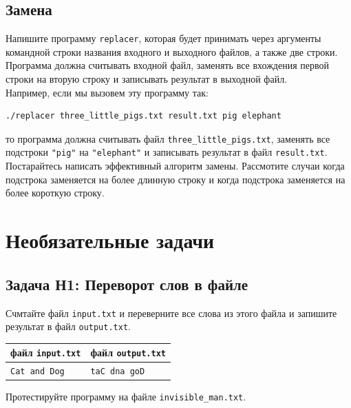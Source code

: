 \documentclass{article}
\begin{document}
\subsection{Замена}
Напишите программу \texttt{replacer}, которая будет принимать через аргументы командной строки названия входного и выходного файлов, а также две строки. Программа должна считывать входной файл, заменять все вхождения первой строки на вторую строку и записывать результат в выходной файл.\\
Например, если мы вызовем эту программу так:
\begin{verbatim}
./replacer three_little_pigs.txt result.txt pig elephant
\end{verbatim}
то программа должна считывать файл \texttt{three\_little\_pigs.txt}, заменять все подстроки \texttt{"pig"} на \texttt{"elephant"} и записывать результат в файл \texttt{result.txt}. Постарайтесь написать эффективный алгоритм замены. Рассмотите случаи когда подстрока заменяется на более длинную строку и когда подстрока заменяется на более короткую строку.


\newpage
\section*{Необязательные задачи}
\subsection*{Задача Н1: Переворот слов в файле}
Счмтайте файл \texttt{input.txt}  и переверните все слова из этого файла и запишите результат в файл \texttt{output.txt}.
\begin{center} 
\begin{tabular}{ l | l }
 файл \texttt{input.txt} & файл \texttt{output.txt} \\ \hline
 \texttt{Cat and Dog} & \texttt{taC dna goD}\\
\end{tabular}
\end{center}
Протестируйте программу на файле \texttt{invisible\_man.txt}.
\end{document}

